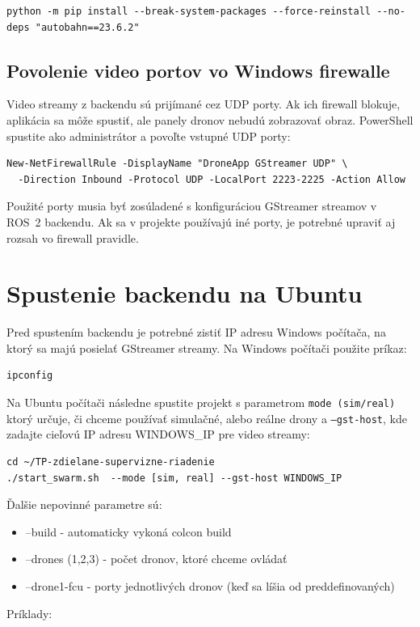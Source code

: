 \documentclass[a4paper,12pt]{article}
\begin{document}
\begin{lstlisting}[style=terminal]
python -m pip install --break-system-packages --force-reinstall --no-deps "autobahn==23.6.2"
\end{lstlisting}

\subsection{Povolenie video portov vo Windows firewalle}

Video streamy z backendu sú prijímané cez UDP porty. Ak ich firewall blokuje, aplikácia sa môže spustiť, ale panely dronov nebudú zobrazovať obraz. PowerShell spustite ako administrátor a povoľte vstupné UDP porty:

\begin{lstlisting}[style=terminal]
New-NetFirewallRule -DisplayName "DroneApp GStreamer UDP" \
  -Direction Inbound -Protocol UDP -LocalPort 2223-2225 -Action Allow
\end{lstlisting}

Použité porty musia byť zosúladené s konfiguráciou GStreamer streamov v ROS~2 backendu. Ak sa v projekte používajú iné porty, je potrebné upraviť aj rozsah vo firewall pravidle.

\section{Spustenie backendu na Ubuntu}

Pred spustením backendu je potrebné zistiť IP adresu Windows počítača, na ktorý sa majú posielať GStreamer streamy. Na Windows počítači použite príkaz:

\begin{lstlisting}[style=terminal]
ipconfig
\end{lstlisting}

Na Ubuntu počítači následne spustite projekt s parametrom \texttt{mode (sim/real)} ktorý určuje, či chceme používať simulačné, alebo reálne drony a  \texttt{--gst-host}, kde zadajte cieľovú IP adresu WINDOWS\_IP pre video streamy:

\begin{lstlisting}[style=terminal]
cd ~/TP-zdielane-supervizne-riadenie
./start_swarm.sh  --mode [sim, real] --gst-host WINDOWS_IP 
\end{lstlisting}

Ďalšie nepovinné parametre sú:
\begin{itemize}
    \item --build - automaticky vykoná colcon build
    \item --drones (1,2,3) - počet dronov, ktoré chceme ovládať
    \item --drone1-fcu - porty jednotlivých dronov (keď sa líšia od preddefinovaných)
\end{itemize}
Príklady:
\end{document}
